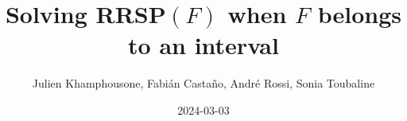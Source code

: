 \documentclass{article}
\begin{document}
     \title{Solving RRSP$(F)$ when $F$ belongs to an interval}
     \author{Julien Khamphousone, Fabi\'an Casta\~no, Andr\'e Rossi, Sonia Toubaline}
     \date{2024-03-03}
     \maketitle
     \def\F{{0.0,0.1142857143,0.1466657915,1.7840010502,2.6666666667,3.2571428571,6.2333333333,6.8566666667}}
\def\gF{{15.09000000000000000000000000000000000000000000000000000000000000000000000000005,15.90142857139999999999999999999999999999999999999999999999999999999999999999994,16.07466198429999999999999999999999999999999999999999999999999999999999999999989,22.37840273059999999999999999999999999999999999999999999999999999999999999999987,24.67333333329999999999999999999999999999999999999999999999999999999999999999989,26.12000000000000000000000000000000000000000000000000000000000000000000000000007,31.32833333330000000000000000000000000000000000000000000000000000000000000000004,2608.298333333333333937294658729418496582861662248151619411523768551908197821376}}
\end{document}
